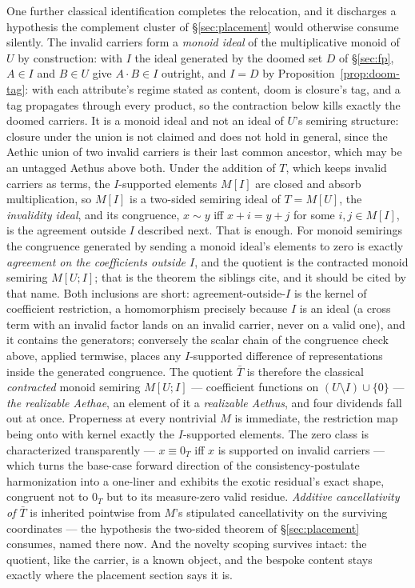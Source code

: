 One further classical identification completes the relocation, and it discharges a hypothesis the complement cluster of \S\ref{sec:placement} would otherwise consume silently. The invalid carriers form a \emph{monoid ideal} of the multiplicative monoid of $U$ by construction: with $I$ the ideal generated by the doomed set $D$ of §\ref{sec:fp}, $A \in I$ and $B \in U$ give $A \cdot B \in I$ outright, and $I = D$ by Proposition~\ref{prop:doom-tag}: with each attribute's regime stated as content, doom is closure's tag, and a tag propagates through every product, so the contraction below kills exactly the doomed carriers. It is a monoid ideal and not an ideal of $U$'s semiring structure: closure under the union is not claimed and does not hold in general, since the Aethic union of two invalid carriers is their last common ancestor, which may be an untagged Aethus above both. Under the addition of $T$, which keeps invalid carriers as terms, the $I$-supported elements $M[I]$ are closed and absorb multiplication, so $M[I]$ is a two-sided semiring ideal of $T = M[U]$, the \emph{invalidity ideal}, and its congruence, $x \sim y$ iff $x + i = y + j$ for some $i, j \in M[I]$, is the agreement outside $I$ described next. That is enough. For monoid semirings the congruence generated by sending a monoid ideal's elements to zero is exactly \emph{agreement on the coefficients outside $I$}, and the quotient is the contracted monoid semiring $M[U; I]$; that is the theorem the siblings cite, and it should be cited by that name. Both inclusions are short: agreement-outside-$I$ is the kernel of coefficient restriction, a homomorphism precisely because $I$ is an ideal (a cross term with an invalid factor lands on an invalid carrier, never on a valid one), and it contains the generators; conversely the scalar chain of the congruence check above, applied termwise, places any $I$-supported difference of representations inside the generated congruence. The quotient $\bar{T}$ is therefore the classical \emph{contracted} monoid semiring $M[U; I]$ --- coefficient functions on $(U \setminus I) \cup \{0\}$ --- \emph{the realizable Aethae}, an element of it a \emph{realizable Aethus}, and four dividends fall out at once. Properness at every nontrivial $M$ is immediate, the restriction map being onto with kernel exactly the $I$-supported elements. The zero class is characterized transparently --- $x \equiv 0_T$ iff $x$ is supported on invalid carriers --- which turns the base-case forward direction of the consistency-postulate harmonization into a one-liner and exhibits the exotic residual's exact shape, congruent not to $0_T$ but to its measure-zero valid residue. \emph{Additive cancellativity of $\bar{T}$} is inherited pointwise from $M$'s stipulated cancellativity on the surviving coordinates --- the hypothesis the two-sided theorem of \S\ref{sec:placement} consumes, named there now. And the novelty scoping survives intact: the quotient, like the carrier, is a known object, and the bespoke content stays exactly where the placement section says it is.

